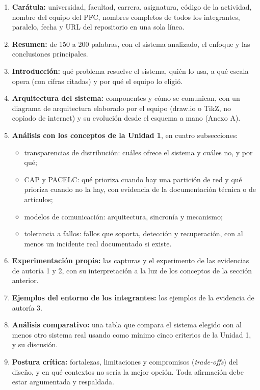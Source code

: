 \documentclass[11pt,a4paper]{article}
\begin{document}
\begin{enumerate}[label=\textbf{\arabic*.},leftmargin=1.8em]
	\item \textbf{Carátula:} universidad, facultad, carrera, asignatura, código de la actividad, nombre del equipo del PFC, nombres completos de todos los integrantes, paralelo, fecha y URL del repositorio en una sola línea.
	\item \textbf{Resumen:} de 150 a 200 palabras, con el sistema analizado, el enfoque y las conclusiones principales.
	\item \textbf{Introducción:} qué problema resuelve el sistema, quién lo usa, a qué escala opera (con cifras citadas) y por qué el equipo lo eligió.
	\item \textbf{Arquitectura del sistema:} componentes y cómo se comunican, con un diagrama de arquitectura elaborado por el equipo (draw.io o TikZ, no copiado de internet) y su evolución desde el esquema a mano (Anexo A).
	\item \textbf{Análisis con los conceptos de la Unidad 1}, en cuatro subsecciones:
	\begin{itemize}
		\item transparencias de distribución: cuáles ofrece el sistema y cuáles no, y por qué;
		\item CAP y PACELC: qué prioriza cuando hay una partición de red y qué prioriza cuando no la hay, con evidencia de la documentación técnica o de artículos;
		\item modelos de comunicación: arquitectura, sincronía y mecanismo;
		\item tolerancia a fallos: fallos que soporta, detección y recuperación, con al menos un incidente real documentado si existe.
	\end{itemize}
	\item \textbf{Experimentación propia:} las capturas y el experimento de las evidencias de autoría 1 y 2, con su interpretación a la luz de los conceptos de la sección anterior.
	\item \textbf{Ejemplos del entorno de los integrantes:} los ejemplos de la evidencia de autoría 3.
	\item \textbf{Análisis comparativo:} una tabla que compara el sistema elegido con al menos otro sistema real usando como mínimo cinco criterios de la Unidad 1, y su discusión.
	\item \textbf{Postura crítica:} fortalezas, limitaciones y compromisos (\emph{trade-offs}) del diseño, y en qué contextos no sería la mejor opción. Toda afirmación debe estar argumentada y respaldada.

\end{enumerate}
\end{document}

